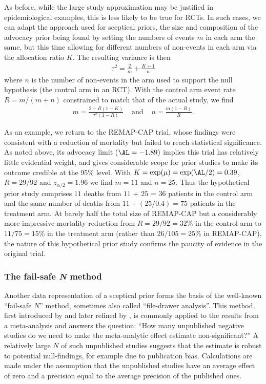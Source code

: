 As before, while the large study approximation may be justified in
epidemiological examples, this is less likely to be true for RCTs. In such
cases, we can adapt the approach used for sceptical priors, the size and
composition of the advocacy prior being found by setting the numbers of events
$m$ in each arm the same, but this time allowing for different numbers of
non-events in each arm via the allocation ratio $K$. The resulting variance is
then
\begin{align*}
  \tau^{2} = \frac{2}{m} + \frac{K + 1}{n}
\end{align*}
where $n$ is the number of non-events in the arm used to support the null
hypothesis (\eg the control arm in an RCT). With the control arm event rate
$R = m/(m + n)$ constrained to match that of the actual study, we find
\begin{eqnarray*}
  m = \frac{2 - R(1 - K)}{\tau^{2}(1 - R)} & \mbox{ and }
  &n = \frac{m(1 - R)}{R}.
\end{eqnarray*}

As an example, we return to the REMAP-CAP trial, whose findings were consistent
with a reduction of mortality but failed to reach statistical significance. As
noted above, its advocacy limit ($\AL = -1.89)$ implies this trial has
relatively little evidential weight, and gives considerable scope for prior
studies to make its outcome credible at the 95\% level. With
$K = \exp(\mu) = \exp(\AL/2) = 0.39$, $R = 29/92$ and $z_{\alpha/2} = 1.96$ we
find $m = 11$ and $n = 25$. Thus the hypothetical prior study comprises $11$
deaths from $11$ + $25$ = $36$ patients in the control arm and the same number
of deaths from $11 + (25/0.4) = 75$ patients in the treatment arm. At barely
half the total size of REMAP-CAP but a considerably more impressive mortality
reduction from $R = 29/92 = 32\%$ in the control arm to $11/75=15$\% in the
treatment arm (rather than $26/105=25$\% in REMAP-CAP), the nature of this
hypothetical prior study confirms the paucity of evidence in the original trial.



\subsubsection{The fail-safe \textit{N} method}
Another data representation of a sceptical prior forms the basis of the
well-known ``fail-safe $N$'' method, sometimes also called ``file-drawer
analysis''. This method, first introduced by \citet{Rosenthal1979} and later
refined by \citet{Rosenberg2005}, is commonly applied to the results from a
meta-analysis and answers the question: ``How many unpublished negative studies
do we need to make the meta-analytic effect estimate non-significant?'' A
relatively large $N$ of such unpublished studies suggests that the estimate is
robust to potential null-findings, for example due to publication bias.
Calculations are made under the assumption that the unpublished studies have an
average effect of zero and a precision equal to the average precision of the
published ones.

